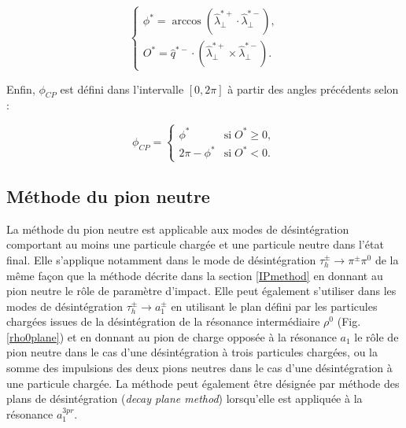 \begin{equation}
    \left\{
    \begin{array}{ll}
        \phi^*=\arccos(\hat{\lambda}^{*+}_{\perp}\cdot \hat{\lambda}^{*-}_{\perp}), \\
        O^*=\hat{q}^{*-}\cdot(\hat{\lambda}^{*+}_{\perp}\times\hat{\lambda}^{*-}_{\perp}).
    \end{array}
    \right.
    \label{phistar}
\end{equation} 

Enfin, $\phi_{CP}$ est défini dans l'intervalle $[0,2\pi]$ à partir des angles précédents selon :

\begin{equation}
\phi_{CP}=
    \left\{
    \begin{array}{ll}
        \phi^* & \mbox{si} \; O^*\geq0, \\
        2\pi - \phi^* & \mbox{si} \; O^*<0.
    \end{array}
    \right.
    \label{phicp}
\end{equation} 

\subsection{Méthode du pion neutre}

La méthode du pion neutre est applicable aux modes de désintégration comportant au moins une particule chargée et une particule neutre dans l'état final. Elle s'applique notamment dans le mode de désintégration $\tau^{\pm}_h\rightarrow\pi^{\pm}\pi^0$ de la même façon que la méthode décrite dans la section \ref{IPmethod} en donnant au pion neutre le rôle de paramètre d'impact. Elle peut également s'utiliser dans les modes de désintégration $\tau^{\pm}_h\rightarrow a_1^{\pm}$ en utilisant le plan défini par les particules chargées issues de la désintégration de la résonance intermédiaire $\rho^0$ (Fig. \ref{rho0plane}) et en donnant au pion de charge opposée à la résonance $a_1$ le rôle de pion neutre dans le cas d'une désintégration à trois particules chargées, ou la somme des impulsions des deux pions neutres dans le cas d'une désintégration à une particule chargée. La méthode peut également être désignée par méthode des plans de désintégration (\textit{decay plane method}) lorsqu'elle est appliquée à la résonance $a_1^{3pr}$. \\

